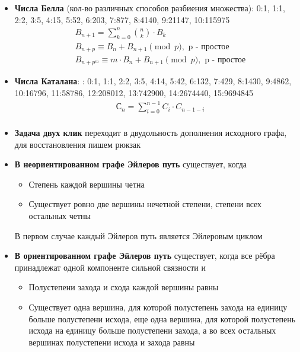 \documentclass[10pt]{article}
\begin{document}
\begin{itemize}
\begin{longtable}[c]{llllllll}
\end{longtable}
\item \textbf{Числа Белла} (кол-во различных способов разбиения множества): 0:1, 1:1, 2:2, 3:5, 4:15, 5:52, 6:203, 7:877, 8:4140, 9:21147, 10:115975\\
\begin{equation}
  \begin{split}
    &B_{n + 1} = \sum\limits_{k = 0}^n\binom{n}{k} \cdot B_k\\
    &B_{n + p} \equiv B_n + B_{n + 1}\pmod{p}, \text{ p - простое}\\
    &B_{n + p^m} \equiv m \cdot B_n + B_{n + 1}\pmod{p}, \text{ p - простое}
  \end{split}
\end{equation}

\item \textbf{Числа Каталана}: : 0:1, 1:1, 2:2, 3:5, 4:14, 5:42, 6:132, 7:429, 8:1430, 9:4862, 10:16796, 11:58786, 12:208012, 13:742900,
14:2674440, 15:9694845
\begin{equation}
  \begin{split}
    &С_{n} = \sum\limits_{i = 0}^{n - 1}C_i \cdot C_{n - 1 - i}\\
  \end{split}
\end{equation}
\item \textbf{Задача двух клик} переходит в двудольность дополнения исходного графа, для восстановления пишем рюкзак
\item \textbf{В неориентированном графе Эйлеров путь} существует, когда 
\begin{itemize}
  \item Степень каждой вершины четна
  \item Существует ровно две вершины нечетной степени, степени всех остальных четны
\end{itemize}
В первом случае каждый Эйлеров путь является Эйлеровым циклом
\item \textbf{В ориентированном графе Эйлеров путь} существует, когда все рёбра принадлежат одной компоненте сильной связности и
\begin{itemize}
  \item Полустепени захода и схода каждой вершины равны
  \item Существует одна вершина, для которой полустепень захода на единицу
  больше полустепени исхода, еще одна вершина, для которой полустепень исхода на единицу больше полустепени захода,
  а во всех остальных вершинах полустепени исхода и захода равны

\end{itemize}
\end{itemize}
\end{document}
